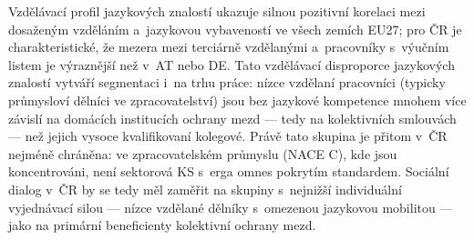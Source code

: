 Vzdělávací profil jazykových znalostí ukazuje silnou pozitivní korelaci mezi dosaženým vzděláním a~jazykovou vybaveností ve všech zemích EU27; pro ČR je charakteristické, že mezera mezi terciárně vzdělanými a~pracovníky s~výučním listem je výraznější než v~AT nebo DE.
Tato vzdělávací disproporce jazykových znalostí vytváří segmentaci i~na trhu práce: nízce vzdělaní pracovníci (typicky průmysloví dělníci ve zpracovatelství) jsou bez jazykové kompetence mnohem více závislí na domácích institucích ochrany mezd --- tedy na kolektivních smlouvách --- než jejich vysoce kvalifikovaní kolegové.
Právě tato skupina je přitom v~ČR nejméně chráněna: ve zpracovatelském průmyslu (\ac{NACE} C), kde jsou koncentrováni, není sektorová \ac{KS} s~erga omnes pokrytím standardem.
Sociální dialog v~ČR by se tedy měl zaměřit na skupiny s~nejnižší individuální vyjednávací silou --- nízce vzdělané dělníky s~omezenou jazykovou mobilitou --- jako na primární beneficienty kolektivní ochrany mezd.



